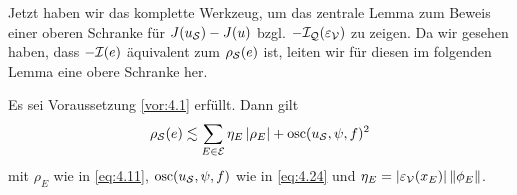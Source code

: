 Jetzt haben wir das komplette Werkzeug, um das zentrale Lemma zum Beweis einer oberen Schranke für $J(u_{\mathcal S})-J(u)$ bzgl. $-\mathcal I_{\mathcal Q}(\varepsilon_{\mathcal V})$ zu zeigen. Da wir gesehen haben, dass $-\mathcal I (e)$ äquivalent zum  $\rho_{\mathcal S}(e)$ ist, leiten wir für diesen im folgenden Lemma  eine obere Schranke her.


\begin{lemma}\label{lem:4.21}
Es sei Voraussetzung \ref{vor:4.1} erfüllt. Dann gilt
\begin{align}
	\rho_{\mathcal S}(e) \lesssim \sum_{E\in \mathcal E} \eta_E \, \lvert \rho_E\rvert + \operatorname{osc}(u_{\mathcal S},\psi,f)^2 
\end{align}
mit $\rho_E$ wie in \eqref{eq:4.11}, $\operatorname{osc} (u_{\mathcal S},\psi,f)$ wie in \eqref{eq:4.24} und $\eta_E = \lvert \varepsilon_{\mathcal V}(x_E)\rvert \, \lVert \phi_E\rVert$.
\end{lemma}


